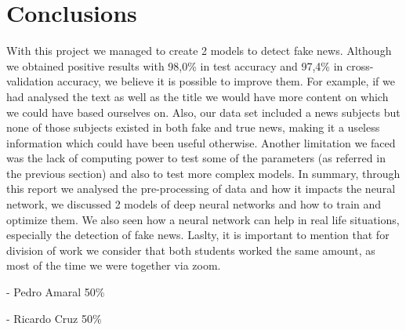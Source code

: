 \documentclass[conference]{IEEEtran}
\newcommand\tab[1][0.4cm]{\hspace*{#1}}
\begin{document}
\section{Conclusions}
With this project we managed to create 2 models to detect fake news. Although we obtained positive results with 98,0\% in test accuracy and 97,4\% in cross-validation accuracy, we believe it is possible to improve them. For example, if we had analysed the text as well as the title we would have more content on which we could have based ourselves on. Also, our data set included a news subjects but none of those subjects existed in both fake and true news, making it a useless information which could have been useful otherwise. Another limitation we faced was the lack of computing power to test some of the parameters (as referred in the previous section) and also to test more complex models.
\linebreak
\tab In summary, through this report we analysed the pre-processing of data and how it impacts the neural network, we discussed 2 models of deep neural networks and how to train and optimize them. We also seen how a neural network can help in real life situations, especially the detection of fake news.
\linebreak
\tab Laslty, it is important to mention that for division of work we consider that both students worked the same amount, as most of the time we were together via zoom.
\begin{flushleft}
- Pedro Amaral 50\%
\end{flushleft}
- Ricardo Cruz 50\%


\nocite{}



\nocite{B}
\nocite{A}
\nocite{D}
\nocite{F}
\nocite{C}
\nocite{H}
\nocite{E}
\nocite{G}
\nocite{I}
\nocite{J}
\nocite{L}
\nocite{N}
\nocite{O}
\nocite{P}
\nocite{Q}
\nocite{R}
\nocite{S}
\nocite{T}
\end{document}
